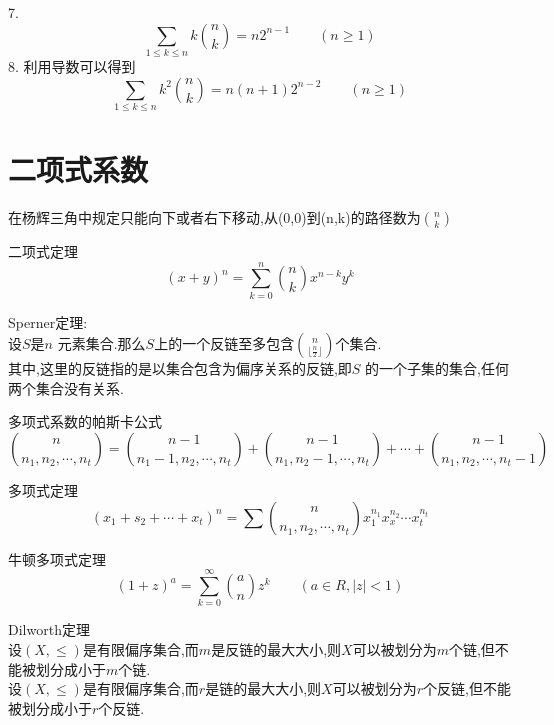 7.
$$
\sum_{1\le k \le n} k\binom{n}{k} =n2^{n-1} \qquad (n\ge 1)
$$
8.
利用导数可以得到
$$
\sum_{1\le k \le n} k^2 \binom{n}{k} =n(n+1)2^{n-2}  \qquad (n\ge 1)
$$


\section{二项式系数}

\begin{proposition}
在杨辉三角中规定只能向下或者右下移动,从(0,0)到(n,k)的路径数为$\binom{n}{k}$
\end{proposition}

\begin{theorem}
二项式定理
$$
(x+y)^n=\sum_{k=0}^{n}\binom{n}{k} x^{n-k}y^k
$$
\end{theorem}

\begin{theorem}
Sperner定理:\\
设$S$是$n$ 元素集合.那么$S$上的一个反链至多包含$\binom{n}{\lfloor \frac{n}{2} \rfloor} $个集合.\\
其中,这里的反链指的是以集合包含为偏序关系的反链,即$S$ 的一个子集的集合,任何两个集合没有关系.
\end{theorem}

\begin{proposition}
多项式系数的帕斯卡公式
$$
\binom{n}{n_1,n_2,\cdots,n_t}=\binom{n-1}{n_1-1,n_2,\cdots,n_t}+\binom{n-1}{n_1,n_2-1,\cdots,n_t}+\cdots+\binom{n-1}{n_1,n_2,\cdots,n_t-1}
$$
\end{proposition}

\begin{theorem}
多项式定理
$$
(x_1+s_2+\cdots+x_t)^n=\sum \binom{n}{n_1,n_2,\cdots,n_t}x_1^{n_1}x_x^{n_2}\cdots x_t^{n_t}
$$
\end{theorem}

\begin{theorem}
牛顿多项式定理
  $$
  (1+z)^a=\sum_{k=0}^{\infty} \binom{a}{n} z^k \qquad  (a\in R,|z|<1)
  $$
\end{theorem}

\begin{theorem}
Dilworth定理\\
设$(X,\leq)$是有限偏序集合,而$m$是反链的最大大小,则$X$可以被划分为$m$个链,但不能被划分成小于$m$个链.\\
设$(X,\leq)$是有限偏序集合,而$r$是链的最大大小,则$X$可以被划分为$r$个反链,但不能被划分成小于$r$个反链.
\end{theorem}
